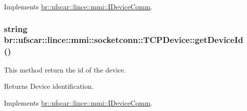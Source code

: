 Implements \hyperlink{classbr_1_1ufscar_1_1lince_1_1mmi_1_1IDeviceComm_ad3791cf1ab234f4a6b464c3f614c78c6}{br::ufscar::lince::mmi::IDeviceComm}.

\hypertarget{classbr_1_1ufscar_1_1lince_1_1mmi_1_1socketconn_1_1TCPDevice_aa45bb0937e02c3d58c9923c369408e5a}{
\subsubsection[{getDeviceId}]{\setlength{\rightskip}{0pt plus 5cm}string br::ufscar::lince::mmi::socketconn::TCPDevice::getDeviceId ()}}
\label{classbr_1_1ufscar_1_1lince_1_1mmi_1_1socketconn_1_1TCPDevice_aa45bb0937e02c3d58c9923c369408e5a}


This method return the id of the device. 

\begin{DoxyReturn}{Returns}
Device identification. 
\end{DoxyReturn}


Implements \hyperlink{classbr_1_1ufscar_1_1lince_1_1mmi_1_1IDeviceComm_a4ae69c19445713ddc9fda351555c1ac2}{br::ufscar::lince::mmi::IDeviceComm}.

